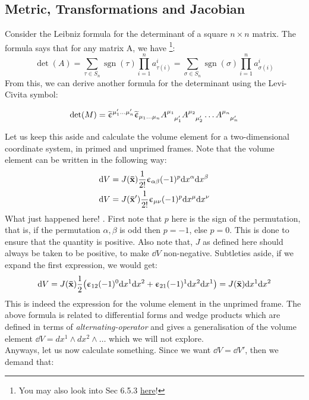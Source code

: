 \subsection{Metric, Transformations and Jacobian}
Consider the Leibniz formula for the determinant of a square $n\times n$ matrix. The formula says that for any matrix A, we have \footnote{You may also look into Sec 6.5.3 \href{https://raw.githubusercontent.com/LoneWolf1304/Notes/main/Tensor Analysis/main.pdf}{here}!}:
$$\det(A) = \sum_{\tau \in S_n} \operatorname{sgn}(\tau) \prod_{i=1}^{n} a^{i}_{\tau(i)} 
= \sum_{\sigma \in S_n} \operatorname{sgn}(\sigma) \prod_{i=1}^{n} a_{\sigma(i)}^{i}$$ 
From this, we can derive another formula for the determinant using the Levi-Civita symbol:
\begin{identity}
$$\det(M)= \widetilde{\upepsilon}^{\mu_1'\ldots \mu_n'} \widetilde{\upepsilon}_{\mu_1\ldots \mu_n} \tensor{A}{^{\mu_1} _{\mu_1'}}\tensor{A}{^{\mu_2} _{\mu_2'}}\ldots\tensor{A}{^{\mu_n} _{\mu_n'}}$$
\end{identity}
Let us keep this aside and calculate the volume element for a two-dimensional coordinate system, in primed and unprimed frames. Note that the volume element can be written in the following way: \begin{align*}
    \dd V &= J(\vb{\bar{x}}) \frac{1}{2!}\upepsilon_{\alpha\beta}(-1)^p \dd x^\alpha \dd x^\beta\\
    \dd V &= J(\vb{\bar{x}}') \frac{1}{2!}\upepsilon_{\mu\nu}(-1)^p \dd x^\mu \dd x^\nu
\end{align*}
What just happened here! . First note that $p$ here is the sign of the permutation, that is, if the permutation $\alpha,\beta$ is odd then $p=-1$, else $p=0$. This is done to ensure that the quantity is positive. Also note that, $J$ as defined here should always be taken to be positive, to make $\dd V$ non-negative. Subtleties aside, if we expand the first expression, we would get:
$$\dd V = J(\vb{\bar{x}}) \frac{1}{2}\qty(\upepsilon_{12} (-1)^0 \dd x^1 \dd x^2 + \upepsilon_{21}(-1)^{1} \dd x^2 \dd x^{1})= J(\vb{\bar{x}})\dd x^1 \dd x^2 $$
This is indeed the expression for the volume element in the unprimed frame. The above formula is related to differential forms and wedge products which are defined in terms of \textit{alternating-operator} and gives a generalisation of the volume element $\dd V = dx^1\wedge dx^2 \wedge \ldots$ which we will not explore.\\[0.2cm]
Anyways, let us now calculate something. Since we want $\dd V = \dd V'$, then we demand that:
